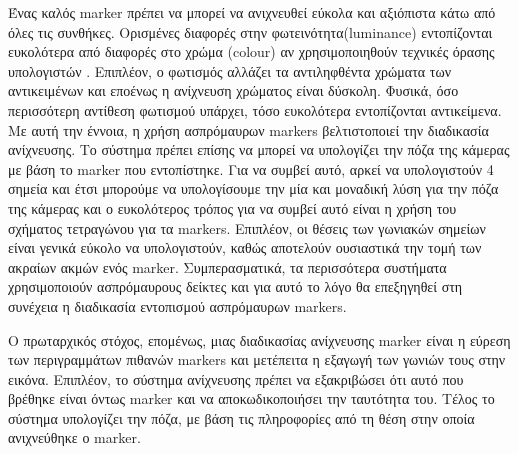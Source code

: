 Ένας καλός marker πρέπει να μπορεί να ανιχνευθεί εύκολα και αξιόπιστα κάτω από όλες τις συνθήκες. Ορισμένες διαφορές στην φωτεινότητα(luminance) εντοπίζονται ευκολότερα από διαφορές στο χρώμα (colour) αν χρησιμοποιηθούν τεχνικές όρασης υπολογιστών \cite{hartley2003multiple} . Επιπλέον, ο φωτισμός αλλάζει τα αντιληφθέντα χρώματα των αντικειμένων και εποένως η ανίχνευση χρώματος είναι δύσκολη. Φυσικά, όσο περισσότερη αντίθεση φωτισμού υπάρχει, τόσο ευκολότερα εντοπίζονται αντικείμενα. Με αυτή την έννοια, η χρήση ασπρόμαυρων markers βελτιστοποιεί την διαδικασία ανίχνευσης. Το σύστημα πρέπει επίσης να μπορεί να υπολογίζει την πόζα της κάμερας με βάση το marker που εντοπίστηκε. Για να συμβεί αυτό, αρκεί να υπολογιστούν 4 σημεία και έτσι μπορούμε να υπολογίσουμε την μία και μοναδική λύση για την πόζα της κάμερας και ο ευκολότερος τρόπος για να συμβεί αυτό είναι η χρήση του σχήματος τετραγώνου για τα markers. Επιπλέον, οι θέσεις των γωνιακών σημείων είναι γενικά εύκολο να υπολογιστούν, καθώς αποτελούν ουσιαστικά την τομή των ακραίων ακμών ενός marker. Συμπερασματικά, τα περισσότερα συστήματα χρησιμοποιούν ασπρόμαυρους δείκτες και για αυτό το λόγο θα επεξηγηθεί στη συνέχεια η διαδικασία εντοπισμού ασπρόμαυρων markers.    


Ο πρωταρχικός στόχος, επομένως, μιας διαδικασίας ανίχνευσης marker είναι η εύρεση των περιγραμμάτων πιθανών markers και μετέπειτα η εξαγωγή των γωνιών τους στην εικόνα. Επιπλέον, το σύστημα ανίχνευσης πρέπει να εξακριβώσει ότι αυτό που βρέθηκε είναι όντως marker και να αποκωδικοποιήσει την ταυτότητα του. Τέλος το σύστημα υπολογίζει την πόζα, με βάση τις πληροφορίες από τη θέση στην οποία ανιχνεύθηκε ο marker.

